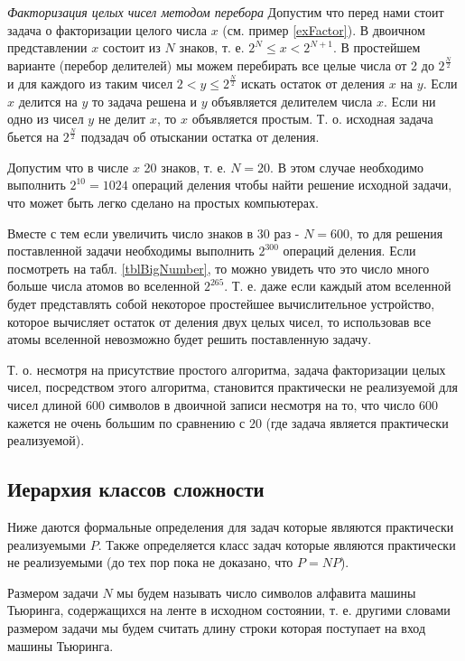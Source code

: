 \begin{example}
\emph{Факторизация целых чисел методом перебора}
\label{exAddAlgoTrialDivision}
Допустим что перед нами стоит задача о факторизации целого числа $x$
(см. пример \ref{exFactor}). 
В двоичном представлении $x$ состоит из $N$ знаков, т. е. 
$2^N \le x < 2^{N+1}$. В простейшем варианте (перебор делителей) мы
можем перебирать все целые числа от 2 до $2^{\frac{N}{2}}$ и для
каждого из таким чисел $2 < y \le 2^{\frac{N}{2}}$ искать остаток от
деления $x$ на $y$. Если $x$ делится на $y$ то задача решена и $y$
объявляется делителем числа $x$. Если ни одно из чисел $y$ не делит
$x$, то $x$ объявляется простым.
Т. о. исходная задача бьется на $2^{\frac{N}{2}}$ подзадач об отыскании
остатка от деления.

Допустим что в числе $x$ 20 знаков, т. е. $N=20$. В этом случае
необходимо выполнить $2^{10} = 1024$ операций деления чтобы найти
решение исходной задачи, что может быть легко сделано на простых
компьютерах. 

Вместе с тем если увеличить число знаков в 30 раз - $N=600$, то для
решения поставленной задачи необходимы выполнить $2^{300}$ операций
деления. Если посмотреть на табл. \ref{tblBigNumber}, то можно увидеть
что это число много больше числа атомов во вселенной
$2^{265}$. Т. е. даже если каждый атом вселенной будет представлять
собой некоторое простейшее вычислительное устройство, которое
вычисляет остаток от деления двух целых чисел, то использовав все
атомы вселенной невозможно будет решить поставленную задачу. 

Т. о. несмотря на присутствие простого алгоритма, задача факторизации
целых чисел, посредством этого алгоритма, становится практически
не реализуемой для чисел длиной $600$ символов в двоичной записи
несмотря на то, что число $600$ кажется не очень большим по сравнению
с $20$ (где задача является практически реализуемой).
\end{example}


\subsection{Иерархия классов сложности}

Ниже даются формальные определения для задач которые являются
практически реализуемыми $P$. Также определяется класс задач которые
являются практически не реализуемыми (до тех пор пока не доказано, что
$P = NP$).

\begin{definition}
Размером задачи $N$ мы будем называть число символов алфавита машины
Тьюринга, содержащихся на ленте в исходном состоянии, т. е. другими
словами размером задачи мы будем считать длину строки которая
поступает на вход машины Тьюринга.
\end{definition}

